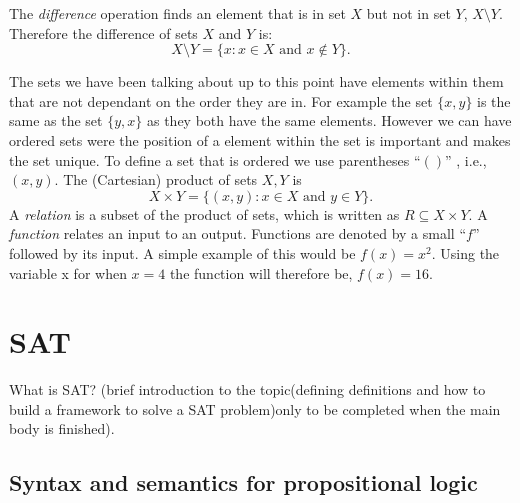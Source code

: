 \documentclass[11pt,a4paper]{report}
\begin{document}
The \emph{difference} operation finds an element that is in set $X$ but not in set $Y$, $X \setminus Y$. Therefore the difference of sets $X$ and $Y$ is:
\begin{displaymath}
  X \setminus Y = \{x : x \in X  \text{ and } x \notin Y\}.
\end{displaymath}

The sets we have been talking about up to this point have elements within them that are not dependant on the order they are in. For example the set $\{x,y\}$ is the same as the set $\{y, x\}$ as they both have the same elements. However we can have ordered sets were the position of a element within the set is important and makes the set unique. To define a set that is ordered we use parentheses  ``$()$'' , i.e., $(x,y)$. 
The (Cartesian) product of sets $X, Y$ is
\begin{displaymath}
  X \times Y = \{(x,y) : x \in X \text{ and } y \in Y\}.
\end{displaymath}
A \emph{relation} is a subset of the product of sets, which is written as $R \subseteq X \times Y$. A \emph{function} relates an input to an output. Functions are denoted by a small ``$f$'' followed by its input. A simple example of this would be $f(x) = x^2$. Using the variable x for when $x=4$ the function will therefore be, $f(x) = 16$.



\section{SAT}
\label{sec:SAT}

What is SAT? (brief introduction to the topic(defining definitions and how to build a framework to solve a SAT problem)only to be completed when the main body is finished).

\subsection{Syntax and semantics for propositional logic}
\label{sec:syntaxsem}
\end{document}
